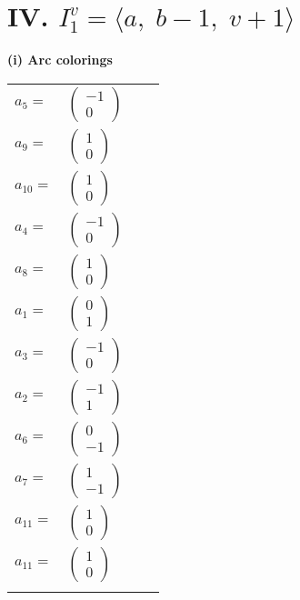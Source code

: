 \documentclass[1p]{elsarticle_modified}
\theoremstyle{definition}
\begin{document}
\centering \section*{IV. $I^v_{1}= \langle a,\;b-1,\;v+1 \rangle$}
\flushleft \textbf{(i) Arc colorings}\\
\begin{tabular}{m{7pt} m{180pt} m{7pt} m{180pt} }
\flushright $a_{5}=$&$\begin{pmatrix}-1\\0\end{pmatrix}$ \\
\flushright $a_{9}=$&$\begin{pmatrix}1\\0\end{pmatrix}$ \\
\flushright $a_{10}=$&$\begin{pmatrix}1\\0\end{pmatrix}$ \\
\flushright $a_{4}=$&$\begin{pmatrix}-1\\0\end{pmatrix}$ \\
\flushright $a_{8}=$&$\begin{pmatrix}1\\0\end{pmatrix}$ \\
\flushright $a_{1}=$&$\begin{pmatrix}0\\1\end{pmatrix}$ \\
\flushright $a_{3}=$&$\begin{pmatrix}-1\\0\end{pmatrix}$ \\
\flushright $a_{2}=$&$\begin{pmatrix}-1\\1\end{pmatrix}$ \\
\flushright $a_{6}=$&$\begin{pmatrix}0\\-1\end{pmatrix}$ \\
\flushright $a_{7}=$&$\begin{pmatrix}1\\-1\end{pmatrix}$ \\
\flushright $a_{11}=$&$\begin{pmatrix}1\\0\end{pmatrix}$\\ \flushright $a_{11}=$&$\begin{pmatrix}1\\0\end{pmatrix}$\\&\end{tabular}
\end{document}
